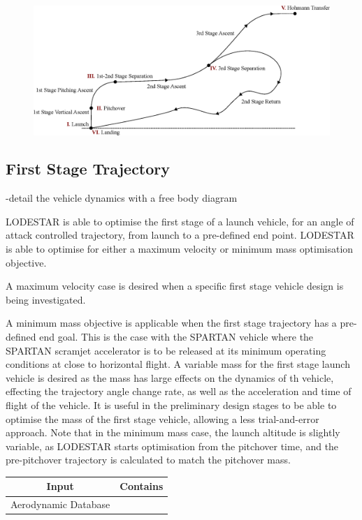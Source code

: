 \begin{figure}
\centering
\includegraphics[width=1.\linewidth]{figures/4_LODESTAR/Traj}
\caption{}
\label{fig:Traj}
\end{figure}


\subsection{First Stage Trajectory}
-detail the vehicle dynamics with a free body diagram 


LODESTAR is able to optimise the first stage of a launch vehicle, for an angle of attack controlled trajectory, from launch to a pre-defined end point. 
LODESTAR is able to optimise for either a maximum velocity or minimum mass optimisation objective. 

A maximum velocity case is desired when a specific first stage vehicle design is being investigated. 
 
A minimum mass objective is applicable when the first stage trajectory has a pre-defined end goal. This is the case with the SPARTAN vehicle where the SPARTAN scramjet accelerator is to be released at its minimum operating conditions at close to horizontal flight. 
A variable mass for the first stage launch vehicle is desired as the mass has large effects on the dynamics of th vehicle, effecting the trajectory angle change rate, as well as the acceleration and time of flight of the vehicle.
It is useful in the preliminary design stages to be able to optimise the mass of the first stage vehicle, allowing a less trial-and-error approach.
Note that in the minimum mass case, the launch altitude is slightly variable, as LODESTAR starts optimisation from the pitchover time, and the pre-pitchover trajectory is calculated to match the pitchover mass. 

\begin{tabular}{|c|c|}
	\hline Input  & Contains\\ 
	\hline Aerodynamic Database  & \\ 
	\hline 
\end{tabular} 


